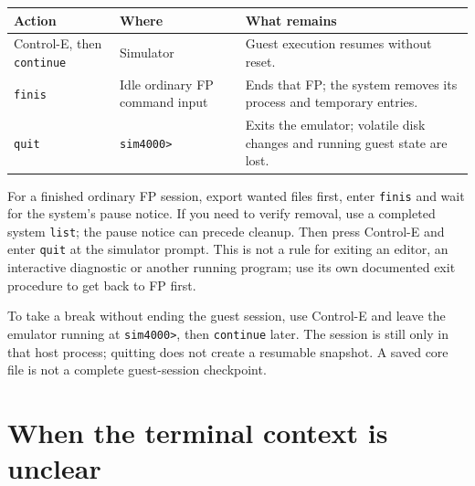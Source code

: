 \begin{longtable}[]{@{}
  >{\raggedright\arraybackslash}p{}
  >{\raggedright\arraybackslash}p{}
  >{\raggedright\arraybackslash}p{}@{}}
\toprule\noalign{}
\begin{minipage}[b]{\linewidth}\raggedright
Action
\end{minipage} & \begin{minipage}[b]{\linewidth}\raggedright
Where
\end{minipage} & \begin{minipage}[b]{\linewidth}\raggedright
What remains
\end{minipage} \\
\midrule\noalign{}
\endhead
\bottomrule\noalign{}
\endlastfoot
Control-E, then \passthrough{\lstinline!continue!} & Simulator & Guest execution resumes without reset. \\
\passthrough{\lstinline!finis!} & Idle ordinary FP command input & Ends that FP; the system removes its process and temporary entries. \\
\passthrough{\lstinline!quit!} & \passthrough{\lstinline!sim4000>!} & Exits the emulator; volatile disk changes and running guest state are lost. \\
\end{longtable}

For a finished ordinary FP session, export wanted files first, enter \passthrough{\lstinline!finis!} and wait for the system's pause notice. If you need to verify removal, use a completed system \passthrough{\lstinline!list!}; the pause notice can precede cleanup. Then press Control-E and enter \passthrough{\lstinline!quit!} at the simulator prompt. This is not a rule for exiting an editor, an interactive diagnostic or another running program; use its own documented exit procedure to get back to FP first.

To take a break without ending the guest session, use Control-E and leave the emulator running at \passthrough{\lstinline!sim4000>!}, then \passthrough{\lstinline!continue!} later. The session is still only in that host process; quitting does not create a resumable snapshot. A saved core file is not a complete guest-session checkpoint.

\section{When the terminal context is unclear}\label{when-the-terminal-context-is-unclear}

